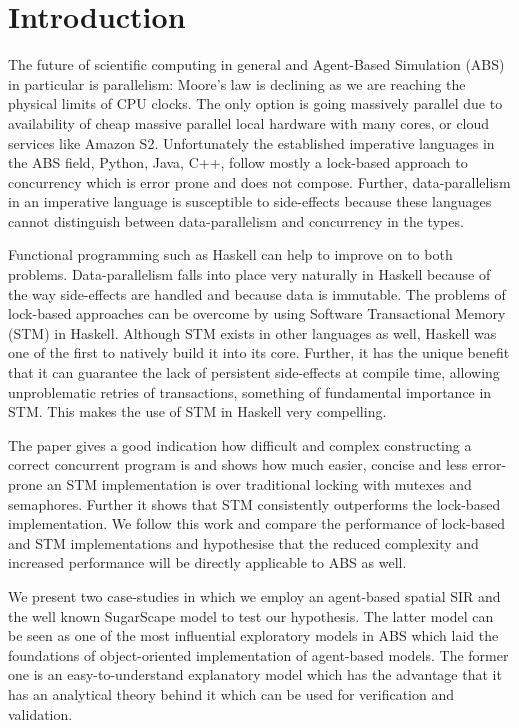 \section{Introduction} %
The future of scientific computing in general and Agent-Based Simulation (ABS) in particular is parallelism: Moore's law is declining as we are reaching the physical limits of CPU clocks. The only option is going massively parallel due to availability of cheap massive parallel local hardware with many cores, or cloud services like Amazon S2. Unfortunately the established imperative languages in the ABS field, Python, Java, C++, follow mostly a lock-based approach to concurrency which is error prone and does not compose. Further, data-parallelism in an imperative language is susceptible to side-effects because these languages cannot distinguish between data-parallelism and concurrency in the types. 

Functional programming such as Haskell can help to improve on to both problems. Data-parallelism falls into place very naturally in Haskell because of the way side-effects are handled and because data is immutable. The problems of lock-based approaches can be overcome by using Software Transactional Memory (STM) in Haskell. Although STM exists in other languages as well, Haskell was one of the first to natively build it into its core. Further, it has the unique benefit that it can guarantee the lack of persistent side-effects at compile time, allowing unproblematic retries of transactions, something of fundamental importance in STM. This makes the use of STM in Haskell very compelling.

The paper \cite{discolo_lock_2006} gives a good indication how difficult and complex constructing a correct concurrent program is and shows how much easier, concise and less error-prone an STM implementation is over traditional locking with mutexes and semaphores. Further it shows that STM consistently outperforms the lock-based implementation. We follow this work and compare the performance of lock-based and STM implementations and hypothesise that the reduced complexity and increased performance will be directly applicable to ABS as well.

We present two case-studies in which we employ an agent-based spatial SIR \citep{macal_agent-based_2010, thaler_pure_2019} and the well known SugarScape \citep{epstein_growing_1996} model to test our hypothesis. The latter model can be seen as one of the most influential exploratory models in ABS which laid the foundations of object-oriented implementation of agent-based models. The former one is an easy-to-understand explanatory model which has the advantage that it has an analytical theory behind it which can be used for verification and validation. 

